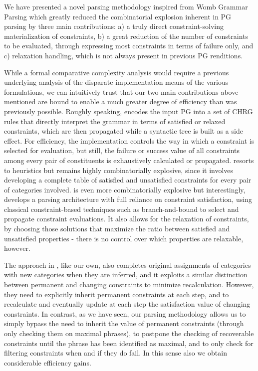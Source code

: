 \documentclass{llncs}
\begin{document}
We have presented a novel parsing methodology inspired from Womb Grammar Parsing which greatly reduced the combinatorial explosion inherent in PG parsing by three main contributions: a) a truly direct constraint-solving materialization of constraints,  b) a great reduction of the number of constraints to be evaluated, through expressing most constraints in terms of failure only, and c) relaxation handling, which is not always present  in previous  PG renditions.

While a formal comparative complexity analysis would require a previous underlying  analysis of the disparate implementation means of the various formulations, we can intuitively trust that our two main contributions above mentioned are bound to enable a much greater degree of efficiency than  was previously possible. Roughly speaking, \cite{DB04} encodes the input PG into a set of CHRG rules that directly interpret the grammar in terms of satisfied or relaxed constraints, which are then propagated while a syntactic tree is built as a side effect. For efficiency, the implementation controls  the way in which a constraint is selected for evaluation, but still, the failure or success value of all constraints among every pair of constituents is exhaustively calculated or propagated.  \cite{BM00} resorts to heuristics but remains highly combinatorially explosive, since it involves developing a complete table of satisfied and unsatisfied constraints for every pair of categories involved. \cite{logcom13DuchierEtAl} is even more combinatorially explosive but interestingly, develops a parsing architecture with  full reliance on constraint satisfaction, using classical constraint-based techniques such as branch-and-bound to select and propagate constraint evaluations. It also allows for the relaxation of constraints, by choosing those solutions that maximize the ratio between satisfied and unsatisfied properties - there is no control over which properties are relaxable, however. 

The approach in \cite{DB04}, like our own, also completes original assignments of categories with
new categories when they are inferred, and it exploits a similar distinction between permanent and changing constraints to minimize recalculation. However, they need to explicitly inherit permanent constraints at each step, and to recalculate and eventually update at each step the satisfaction value of changing constraints. In contrast, as we have seen, our parsing methodology allows us to  simply bypass the need to inherit the value of permanent constraints (through only checking them on maximal phrases), to postpone the checking of recoverable constraints until the phrase has been identified as maximal, and to only check for filtering constraints when and if they do fail. In this sense also we obtain considerable efficiency gains.
\end{document}
